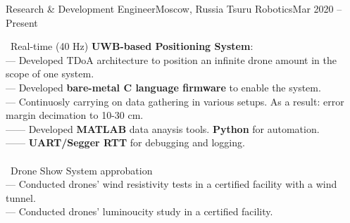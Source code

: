 \resumeSubheading
  {Research \& Development Engineer}{Moscow, Russia}
  {Tsuru Robotics}{Mar 2020 -- Present}
  \begin{itemize}[leftmargin=0in, label={}]
    \small{\item{
      {\textbullet \ Real-time (40 Hz) \textbf{UWB-based Positioning System}:}\\
      {— Developed TDoA architecture to position an infinite drone amount in the scope of one system.}\\
      {— Developed \textbf{bare-metal C language firmware} to enable the system.}\\
      {— Continuosly carrying on data gathering in various setups. As a result: error margin decimation to 10-30 cm.}\\
      {—— Developed \textbf{MATLAB} data anaysis tools. \textbf{Python} for automation.}\\
      {—— \textbf{UART/Segger RTT} for debugging and logging.}\\
      {\ }\\
      {\textbullet \ Drone Show System approbation}\\
      {— Conducted drones' wind resistivity tests in a certified facility with a wind tunnel.}\\
      {— Conducted drones' luminoucity study in a certified facility.}\\
    }}
  \end{itemize}